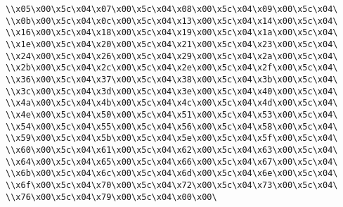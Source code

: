 \verb|\\x05\x00\x5c\x04\x07\x00\x5c\x04\x08\x00\x5c\x04\x09\x00\x5c\x04\|\newline
\verb|\\x0b\x00\x5c\x04\x0c\x00\x5c\x04\x13\x00\x5c\x04\x14\x00\x5c\x04\|\newline
\verb|\\x16\x00\x5c\x04\x18\x00\x5c\x04\x19\x00\x5c\x04\x1a\x00\x5c\x04\|\newline
\verb|\\x1e\x00\x5c\x04\x20\x00\x5c\x04\x21\x00\x5c\x04\x23\x00\x5c\x04\|\newline
\verb|\\x24\x00\x5c\x04\x26\x00\x5c\x04\x29\x00\x5c\x04\x2a\x00\x5c\x04\|\newline
\verb|\\x2b\x00\x5c\x04\x2c\x00\x5c\x04\x2e\x00\x5c\x04\x2f\x00\x5c\x04\|\newline
\verb|\\x36\x00\x5c\x04\x37\x00\x5c\x04\x38\x00\x5c\x04\x3b\x00\x5c\x04\|\newline
\verb|\\x3c\x00\x5c\x04\x3d\x00\x5c\x04\x3e\x00\x5c\x04\x40\x00\x5c\x04\|\newline
\verb|\\x4a\x00\x5c\x04\x4b\x00\x5c\x04\x4c\x00\x5c\x04\x4d\x00\x5c\x04\|\newline
\verb|\\x4e\x00\x5c\x04\x50\x00\x5c\x04\x51\x00\x5c\x04\x53\x00\x5c\x04\|\newline
\verb|\\x54\x00\x5c\x04\x55\x00\x5c\x04\x56\x00\x5c\x04\x58\x00\x5c\x04\|\newline
\verb|\\x59\x00\x5c\x04\x5b\x00\x5c\x04\x5e\x00\x5c\x04\x5f\x00\x5c\x04\|\newline
\verb|\\x60\x00\x5c\x04\x61\x00\x5c\x04\x62\x00\x5c\x04\x63\x00\x5c\x04\|\newline
\verb|\\x64\x00\x5c\x04\x65\x00\x5c\x04\x66\x00\x5c\x04\x67\x00\x5c\x04\|\newline
\verb|\\x6b\x00\x5c\x04\x6c\x00\x5c\x04\x6d\x00\x5c\x04\x6e\x00\x5c\x04\|\newline
\verb|\\x6f\x00\x5c\x04\x70\x00\x5c\x04\x72\x00\x5c\x04\x73\x00\x5c\x04\|\newline
\verb|\\x76\x00\x5c\x04\x79\x00\x5c\x04\x00\x00\|\newline
